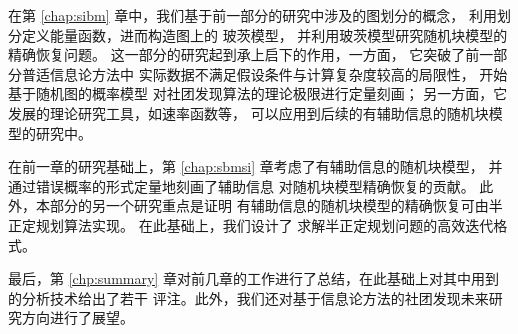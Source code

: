 在第 \ref{chap:sibm} 章中，我们基于前一部分的研究中涉及的图划分的概念，
利用划分定义能量函数，进而构造图上的 玻茨模型，
并利用玻茨模型研究随机块模型的精确恢复问题。
这一部分的研究起到承上启下的作用，一方面，
它突破了前一部分普适信息论方法中
实际数据不满足假设条件与计算复杂度较高的局限性，
开始基于随机图的概率模型
对社团发现算法的理论极限进行定量刻画；
另一方面，它发展的理论研究工具，如速率函数等，
可以应用到后续的有辅助信息的随机块模型的研究中。

在前一章的研究基础上，第 \ref{chap:sbmsi} 章考虑了有辅助信息的随机块模型，
并通过错误概率的形式定量地刻画了辅助信息
对随机块模型精确恢复的贡献。
此外，本部分的另一个研究重点是证明
有辅助信息的随机块模型的精确恢复可由半正定规划算法实现。
在此基础上，我们设计了
求解半正定规划问题的高效迭代格式。

最后，第 \ref{chp:summary} 章对前几章的工作进行了总结，在此基础上对其中用到的分析技术给出了若干
评注。此外，我们还对基于信息论方法的社团发现未来研究方向进行了展望。